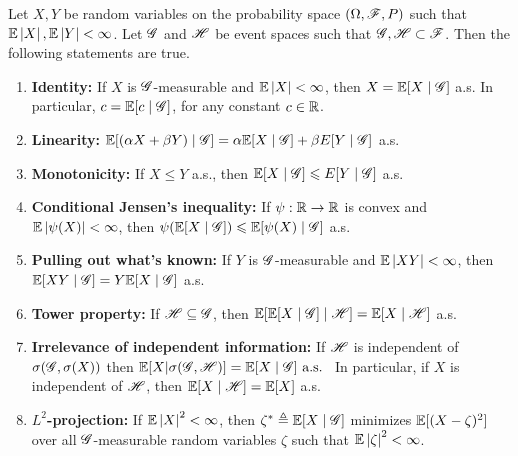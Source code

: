 \documentclass[letterpaper,10pt,english]{article}
\begin{document}
\begin{prop} 
Let $X,Y$ be random variables on the probability space $(\Omega, \mathscr{F}, P)$ such that $\mathbb{E}\left\lvert X\right\rvert , \mathbb{E}\left\lvert Y\right\rvert < \infty$. 
Let $\mathscr{G}$ and $\mathscr{H}$ be event spaces such that $\mathscr{G}, \mathscr{H} \subset \mathscr{F}$. 
Then the following statements are true. 
\begin{enumerate}
\item \textbf{Identity:} If $X$ is $\mathscr{G}$-measurable and $\mathbb{E}\left\lvert X\right\rvert < \infty$, then $X = \mathbb{E}[X\mid\mathscr{G}]$ a.s. 
In particular, $c = \mathbb{E}[c\mid \mathscr{G}]$, for any constant $c \in  \mathbb{R}$. 
\item \textbf{Linearity:} $\mathbb{E}[(\alpha X + \beta Y) \mid \mathscr{G}] = \alpha \mathbb{E}[X\mid\mathscr{G}] + \beta E[Y\mid \mathscr{G}]$ a.s.
\item \textbf{Monotonicity:} If $X \le Y$ a.s., then $\mathbb{E}[X\mid\mathscr{G}] \leqslant E[Y\mid \mathscr{G}]$ a.s.
\item \textbf{Conditional Jensen's inequality:} If $\psi : \mathbb{R} \to  \mathbb{R}$ is convex and $\mathbb{E}\left\lvert\psi(X)\right\rvert <\infty$, 
then $\psi(\mathbb{E}[X\mid\mathscr{G}]) \leqslant \mathbb{E}[\psi(X) \mid \mathscr{G}]$ a.s. 

\item \textbf{Pulling out what's known:} If $Y$ is $\mathscr{G}$-measurable and $\mathbb{E}\left\lvert XY\right\rvert <\infty$, then
$\mathbb{E}[XY\mid \mathscr{G}] = Y\mathbb{E}[X\mid\mathscr{G}]$ a.s.
\item \textbf{Tower property:} If $\mathscr{H} \subseteq \mathscr{G}$, then
$\mathbb{E}[\mathbb{E}[X\mid\mathscr{G}]\mid \mathscr{H}] = \mathbb{E}[X\mid \mathscr{H}]$ a.s.
\item \textbf{Irrelevance of independent information:} If $\mathscr{H}$ is independent of $\sigma (\mathscr{G}, \sigma (X))$
then
$\mathbb{E}[X|\sigma (\mathscr{G}, \mathscr{H})] = \mathbb{E}[X\mid\mathscr{G}] \text{ a.s. }$
In particular, if $X$ is independent of $\mathscr{H}$, then $\mathbb{E}[X\mid \mathscr{H}] = \mathbb{E}[X]$ a.s.
\item \textbf{$L^2$-projection:} If $\mathbb{E}\left\lvert X\right\rvert^2 < \infty$, then $\zeta^\ast \triangleq \mathbb{E}[X\mid\mathscr{G}]$ minimizes $\mathbb{E}[(X - \zeta)^2]$
over all $\mathscr{G}$-measurable random variables $\zeta$ such that $\mathbb{E}\left\lvert\zeta\right\rvert^2 < \infty$. 
\end{enumerate}
\end{prop}
\end{document}
